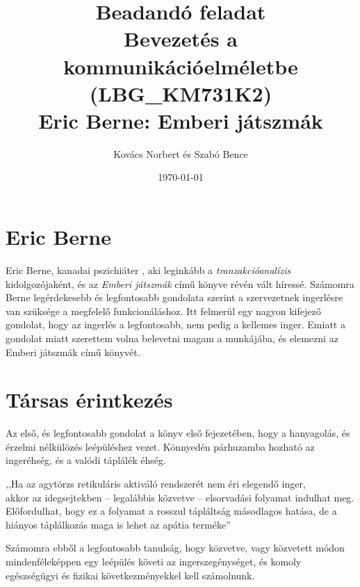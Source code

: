 \documentclass[a4paper,12pt]{article}
\begin{document}
	\pagestyle{fancy}
	\fancyhf{}
	\fancyhead[LE,RO]{\normalfont\normalsize\thepage}
	\fancyhead[RE]{\nouppercase{\sffamily\small\leftmark}}
	\fancyhead[LO]{\nouppercase{\sffamily\small\rightmark}}
	
	\title{{\Large Beadandó feladat} \\Bevezetés a kommunikációelméletbe  \\ {\small (LBG\_KM731K2)} \\[1cm] {\huge Eric Berne: Emberi játszmák}}
	
	\author{Kovács Norbert és Szabó Bence}
	
	\date{\today}
	\maketitle
	
	\newpage
	\section*{Eric Berne}
	Eric Berne, kanadai pszichiáter , aki leginkább a \textit{tranzakcióanalízis} kidolgozójaként, és az \textit{Emberi játszmák} című könyve révén vált híressé.
	Számomra Berne legérdekesebb és legfontosabb gondolata szerint a szervezetnek ingerlésre van szüksége a megfelelő funkcionáláshoz. Itt felmerül egy nagyon kifejező gondolat, hogy az ingerlés a legfontosabb, nem pedig a kellemes inger. Emiatt a gondolat miatt szerettem volna belevetni magam a munkájába, és elemezni az Emberi játszmák című könyvét.
	
	\section{Társas érintkezés}
	Az első, és legfontosabb gondolat a könyv első fejezetében, hogy a hanyagolás, és érzelmi nélkülözés leépüléshez vezet. Könnyedén párhuzamba hozható az ingeréhség, és a valódi táplálék éhség. 

	\begin{flushright}
		,,Ha az agytörzs retikuláris aktiváló rendszerét nem éri elegendő inger,\\ akkor az idegsejtekben -- legalábbis közvetve -- elsorvadási folyamat indulhat meg. Előfordulhat, hogy ez a folyamat a rosszul tápláltság másodlagos hatása, de a hiányos táplálkozás maga is lehet az apátia terméke''
	\end{flushright}

	Számomra ebből a legfontosabb tanulság, hogy közvetve, vagy közvetett módon mindenféleképpen egy leépülés követi az ingerszegénységet, és komoly egészségügyi és fizikai következményekkel kell számolnunk.
	
\end{document}
